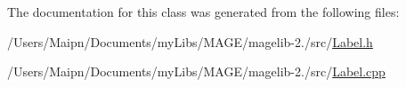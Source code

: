 The documentation for this class was generated from the following files\-:\begin{DoxyCompactItemize}
\item 
/\-Users/\-Maipn/\-Documents/my\-Libs/\-M\-A\-G\-E/magelib-\/2./src/\hyperlink{_label_8h}{Label.\-h}\item 
/\-Users/\-Maipn/\-Documents/my\-Libs/\-M\-A\-G\-E/magelib-\/2./src/\hyperlink{_label_8cpp}{Label.\-cpp}\end{DoxyCompactItemize}
